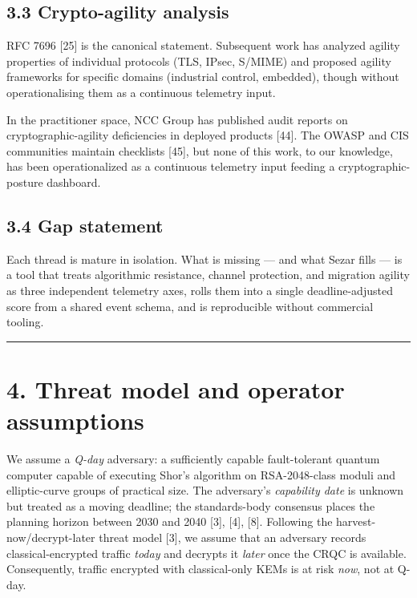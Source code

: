 \subsection{3.3 Crypto-agility analysis}\label{crypto-agility-analysis}

RFC 7696 {[}25{]} is the canonical statement. Subsequent work has
analyzed agility properties of individual protocols (TLS, IPsec, S/MIME)
and proposed agility frameworks for specific domains (industrial
control, embedded), though without operationalising them as a continuous
telemetry input.

In the practitioner space, NCC Group has published audit reports on
cryptographic-agility deficiencies in deployed products {[}44{]}. The
OWASP and CIS communities maintain checklists {[}45{]}, but none of this
work, to our knowledge, has been operationalized as a continuous
telemetry input feeding a cryptographic-posture dashboard.

\subsection{3.4 Gap statement}\label{gap-statement}

Each thread is mature in isolation. What is missing --- and what Sezar
fills --- is a tool that treats algorithmic resistance, channel
protection, and migration agility as three independent telemetry axes,
rolls them into a single deadline-adjusted score from a shared event
schema, and is reproducible without commercial tooling.

\begin{center}\rule{0.5\linewidth}{0.5pt}\end{center}

\section{4. Threat model and operator
assumptions}\label{threat-model-and-operator-assumptions}

We assume a \emph{Q-day} adversary: a sufficiently capable
fault-tolerant quantum computer capable of executing Shor's algorithm on
RSA-2048-class moduli and elliptic-curve groups of practical size. The
adversary's \emph{capability date} is unknown but treated as a moving
deadline; the standards-body consensus places the planning horizon
between 2030 and 2040 {[}3{]}, {[}4{]}, {[}8{]}. Following the
harvest-now/decrypt-later threat model {[}3{]}, we assume that an
adversary records classical-encrypted traffic \emph{today} and decrypts
it \emph{later} once the CRQC is available. Consequently, traffic
encrypted with classical-only KEMs is at risk \emph{now}, not at Q-day.

